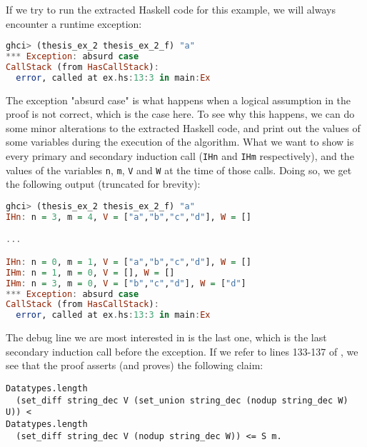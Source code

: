 If we try to run the extracted Haskell code for this example,
we will always encounter a runtime exception:

\begin{minipage}{\linewidth}
\begin{lstlisting}[language=Haskell, label={lst:thm_32_haskell_output_extended}, caption={\lstinline{thm_32} example extended output}]
ghci> (thesis_ex_2 thesis_ex_2_f) "a"
*** Exception: absurd case
CallStack (from HasCallStack):
  error, called at ex.hs:13:3 in main:Ex
\end{lstlisting}
\end{minipage}

The exception "absurd case" is what happens when a logical assumption in the proof
is not correct, which is the case here.
To see why this happens, we can do some minor alterations to the extracted Haskell code,
and print out the values of some variables during the execution of the algorithm.
What we want to show is every primary and secondary induction call (\lstinline{IHn} and \lstinline{IHm} respectively),
and the values of the variables \lstinline{n}, \lstinline{m}, \lstinline{V} and \lstinline{W} at the time of those calls.
Doing so, we get the following output (truncated for brevity):

\begin{minipage}{\linewidth}
\begin{lstlisting}[language=Haskell, label={lst:thm_32_haskell_output_extended_debug}, caption={\lstinline{thm_32} example extended output with debug}]
ghci> (thesis_ex_2 thesis_ex_2_f) "a"
IHn: n = 3, m = 4, V = ["a","b","c","d"], W = []

...

IHn: n = 0, m = 1, V = ["a","b","c","d"], W = []
IHm: n = 1, m = 0, V = [], W = []
IHm: n = 3, m = 0, V = ["b","c","d"], W = ["d"]
*** Exception: absurd case
CallStack (from HasCallStack):
  error, called at ex.hs:13:3 in main:Ex
\end{lstlisting}
\end{minipage}

The debug line we are most interested in is the last one,
which is the last secondary induction call before the exception.
If we refer to lines 133-137 of ,
we see that the proof asserts (and proves) the following claim:

\begin{minipage}{\linewidth}
\begin{lstlisting}[language=Coq, label={lst:thm_32_false_claim}, caption={False claim in \lstinline{thm_32} proof}]
Datatypes.length
  (set_diff string_dec V (set_union string_dec (nodup string_dec W) U)) <
Datatypes.length
  (set_diff string_dec V (nodup string_dec W)) <= S m.
\end{lstlisting}
\end{minipage}

